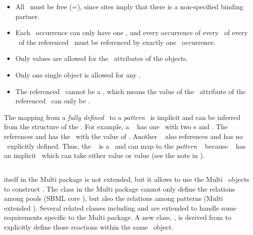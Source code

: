 \begin{itemize}
 \item All \outwardBindingSites\ must be free (\bindingStatusAtt=), since  sites imply that there is a non-specified binding partner.
 \item Each \speciesFeature\ occurrence can only have one \speciesFeatureValue, and every occurrence of every \speciesFeatureType\ of every \component\ of the referenced \speciesType\ must be referenced by exactly one \speciesFeature\  occurrence.
 \item \mBlockChangedBegin{\revTwentyTwentyMarch}Only  values are allowed for the \relationAtt\ attributes of the \SubListOfSpeciesFeatures objects.\mBlockChangedEnd{\revTwentyTwentyMarch}
 \item Only one single \SpeciesFeatureValue object is allowed for any \speciesFeature.
 \item The referenced \compartment\ cannot be a , which means the value of the \isTypeAtt\ attribute of the referenced \compartment\ can only be .
\end{itemize}

The mapping from a \emph{fully defined} \species\ to a \emph{pattern} \species\ is implicit and can be inferred from the structure of the \species. For example, a \speciesType\  has one \speciesFeatureType\ with two \possibleSpeciesFeatureValue s  and . The \species\   references  and has the \speciesFeature\ with the value of . Another \species\  also references  and has no \speciesFeature\ explicitly defined. Thus, the \species\  is a  \species\ and can map to the \emph{pattern} \species\  because \species\  has an implicit \speciesFeature\ which can take either value  or value  (see the note in ).


\subsection{}
\label{def:ExReaction}


 itself in the Multi package is not extended, but it \mBlockChangedBegin{\revTwentyTwentyMarch}allows to\mBlockChangedEnd{\revTwentyTwentyMarch} use the Multi \ExSpecies\ objects to construct \reactions. The  class in the Multi package cannot only define the relations among pools (SBML core \species), but also the relations among patterns (Multi extended \species). Several related classes including \ExSimpleSpeciesReference and \ExSpeciesReference are extended to handle some \mBlockChangedBegin{\revTwentyTwentyMarch}requirements\mBlockChangedEnd{\revTwentyTwentyMarch} specific to the Multi package. A new class, \IntraSpeciesReaction, is derived from  to explicitly define those reactions within the same \ExSpecies\ object.

